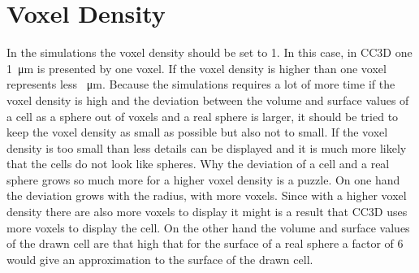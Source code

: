 \section{Voxel Density}
In the simulations the voxel density should be set to 1. In this case, in \ac{CC3D} one \SI{1}{\micro\metre} is presented by one voxel. If the voxel density is higher than one voxel represents less \SI{}{\micro\metre}. Because the simulations requires a lot of more time if the voxel density is high and the deviation between the volume and surface values of a cell as a sphere out of voxels and a real sphere is larger, it should be tried to keep the voxel density as small as possible but also not to small. If the voxel density is too small than less details can be displayed and it is much more likely that the cells do not look like spheres. Why the deviation of a cell and a real sphere grows so much more for a higher voxel density is a puzzle. \newline
On one hand the deviation grows with the radius, with more voxels. Since with a higher voxel density there are also more voxels to display it might is a result that \ac{CC3D} uses more voxels to display the cell. On the other hand the volume and surface values of the drawn cell are that high that for the surface of a real sphere a factor of 6 would give an approximation to the surface of the drawn cell. \newline
